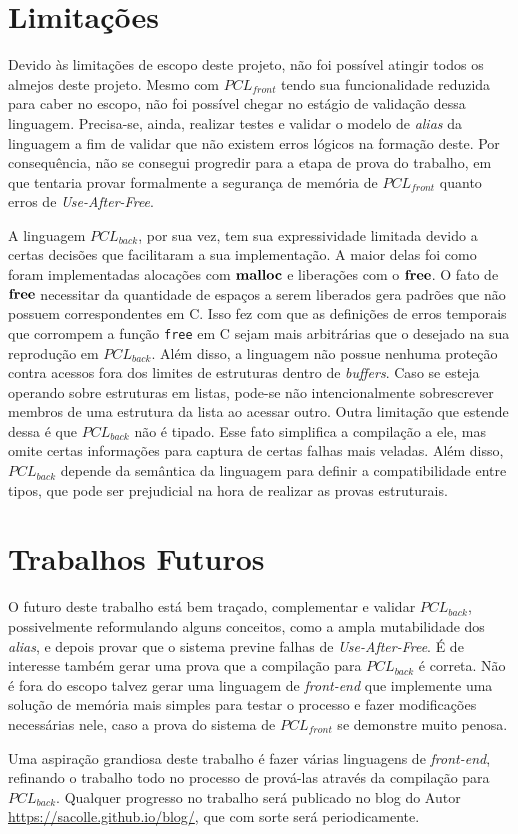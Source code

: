 \section{Limitações}

Devido às limitações de escopo deste projeto, não foi possível atingir todos os almejos deste projeto. Mesmo com $PCL_{front}$ tendo sua funcionalidade reduzida para caber no escopo, não foi possível chegar no estágio de validação dessa linguagem. Precisa-se, ainda, realizar testes e validar o modelo de \emph{alias} da linguagem a fim de validar que não existem erros lógicos na formação deste. Por consequência, não se consegui progredir para a etapa de prova do trabalho, em que tentaria provar formalmente a segurança de memória de $PCL_{front}$ quanto erros de \emph{Use-After-Free}.

A linguagem $PCL_{back}$, por sua vez, tem sua expressividade limitada devido a certas decisões que facilitaram a sua implementação. A maior delas foi como foram implementadas alocações com $\mathbf{malloc}$ e liberações com o $\mathbf{free}$. O fato de $\mathbf{free}$ necessitar da quantidade de espaços a serem liberados gera padrões que não possuem correspondentes em C. Isso fez com que as definições de erros temporais que corrompem a função \lstinline[language=C]|free| em C sejam mais arbitrárias que o desejado na sua reprodução em $PCL_{back}$. Além disso, a linguagem não possue nenhuma proteção contra acessos fora dos limites de estruturas dentro de \emph{buffers}. Caso se esteja operando sobre estruturas em listas, pode-se não intencionalmente sobrescrever membros de uma estrutura da lista ao acessar outro. Outra limitação que estende dessa é que $PCL_{back}$ não é tipado. Esse fato simplifica a compilação a ele, mas omite certas informações para captura de certas falhas mais veladas. Além disso, $PCL_{back}$ depende da semântica da linguagem para definir a compatibilidade entre tipos, que pode ser prejudicial na hora de realizar as provas estruturais.

\section{Trabalhos Futuros}

O futuro deste trabalho está bem traçado, complementar e validar $PCL_{back}$, possivelmente reformulando alguns conceitos, como a ampla mutabilidade dos \emph{alias}, e depois provar que o sistema previne falhas de \emph{Use-After-Free}. É de interesse também gerar uma prova que a compilação para $PCL_{back}$ é correta. Não é fora do escopo talvez gerar uma linguagem de \emph{front-end} que implemente uma solução de memória mais simples para testar o processo e fazer modificações necessárias nele, caso a prova do sistema de $PCL_{front}$ se demonstre muito penosa.

Uma aspiração grandiosa deste trabalho é fazer várias linguagens de \emph{front-end}, refinando o trabalho todo no processo de prová-las através da compilação para $PCL_{back}$. Qualquer progresso no trabalho será publicado no blog do Autor \url{https://sacolle.github.io/blog/}, que com sorte será periodicamente. 